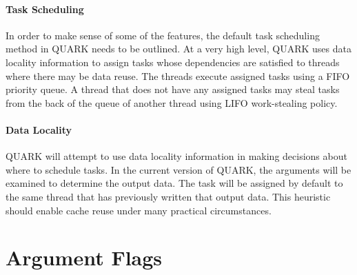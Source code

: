 \documentclass[11pt,letterpaper]{report}
\begin{document}
\paragraph{Task Scheduling}
In order to make sense of some of the features, the default task
scheduling method in QUARK needs to be outlined.  At a very high
level, QUARK uses data locality information to assign tasks whose
dependencies are satisfied to threads where there may be data reuse.
The threads execute assigned tasks using a FIFO priority queue.  A
thread that does not have any assigned tasks may steal tasks from the
back of the queue of another thread using LIFO work-stealing policy.

\paragraph{Data Locality}
QUARK will attempt to use data locality information in making
decisions about where to schedule tasks.  In the current version of
QUARK, the arguments will be examined to determine the output data.
The task will be assigned by default to the same thread that has
previously written that output data.  This heuristic should enable
cache reuse under many practical circumstances.


\section{Argument Flags}
\end{document}
